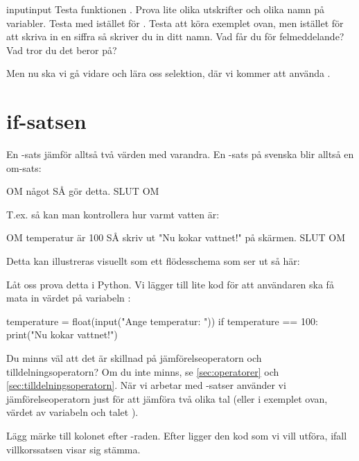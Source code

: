 \begin{matteovning}{input}{input}
Testa funktionen . Prova lite olika utskrifter och olika namn på variabler. Testa med  istället för .
\newline
\newline
Testa att köra exemplet ovan, men istället för att skriva in en siffra så skriver du in ditt namn. Vad får du för felmeddelande? Vad tror du det beror på?
\end{matteovning}

Men nu ska vi gå vidare och lära oss selektion, där vi kommer att använda .

\section{if-satsen}
En -sats jämför alltså två värden med varandra. En -sats på svenska blir alltså en om-sats:

\begin{pseudo}
OM något SÅ
	gör detta.
SLUT OM
\end{pseudo}

T.ex. så kan man kontrollera hur varmt vatten är:

\begin{pseudo}
OM temperatur är 100 SÅ
	skriv ut "Nu kokar vattnet!" på skärmen.
SLUT OM
\end{pseudo}

Detta kan illustreras visuellt som ett flödesschema som ser ut så här:


Låt oss prova detta i Python. Vi lägger till lite kod för att användaren ska få mata in värdet på variabeln :
\begin{python}[caption={Vår första if-sats},label={code:kokar1}]
temperature = float(input("Ange temperatur: "))
if temperature == 100:
    print("Nu kokar vattnet!")
\end{python}

Du minns väl att det är skillnad på jämförelseoperatorn och tilldelningsoperatorn? Om du inte minns, se \autoref{sec:operatorer} och \autoref{sec:tilldelningsoperatorn}. När vi arbetar med -satser använder vi jämförelseoperatorn just för att jämföra två olika tal (eller i exemplet ovan, värdet av variabeln  och talet ).

Lägg märke till kolonet \cw{:} efter -raden. Efter  ligger den kod som vi vill utföra, ifall villkorssatsen visar sig stämma.

